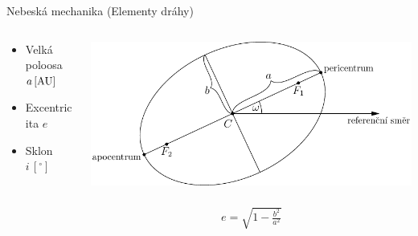 \documentclass[xcolor=dvipsnames]{beamer}
\begin{document}
\begin{frame}{Nebeská mechanika (Elementy dráhy)}
\begin{columns}
\begin{column}{0.4\textwidth}
\begin{itemize}
\item Velká poloosa $a\,[{\rm AU}]$  
\item Excentricita $e$
\item Sklon $i\,[ ^\circ]$
\end{itemize}
\end{column}
\begin{column}{0.6\textwidth}
\includegraphics[width=\textwidth]{../asy/asteroidy-1.pdf}
\
\begin{align*}
	e=\sqrt{1-\frac{b^2}{a^2}}
\end{align*}
\end{column}
\end{columns}
\end{frame}
\end{document}
